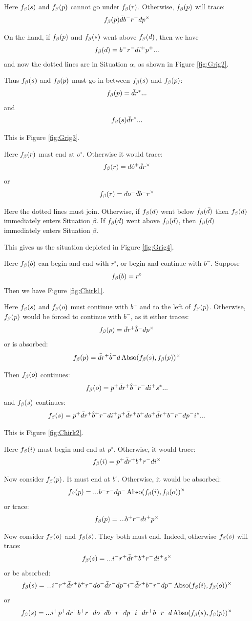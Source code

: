 Here $f_\beta(s)$ and $f_\beta(p)$ cannot go under $f_\beta(r)$. Otherwise, $f_\beta(p)$ will trace:
\[
f_\beta(p)  \bar{d} b^- r^- d p^\times
\]

On the hand, if $f_\beta(p)$ and $f_\beta(s)$ went above $f_\beta(d)$, then we have
\[
f_\beta(d) = b^- r^- d i^+ p^+...
\]
and now the dotted lines are in Situation $\alpha$, as shown in Figure \ref{fig:Grig2}.

Thus $f_\beta(s)$ and $f_\beta(p)$ must go in between $f_\beta(s)$ and $f_\beta(p)$:
\[
f_\beta(p) = \bar{d} r^*...
\]
and
\[
f_\beta(s) \bar{d} r^*...
\]

This is Figure \ref{fig:Grig3}.

Here $f_\beta(r)$ must end at $o^\circ$. Otherwise it would trace:
\[
f_\beta(r) = d \hat{o}^+ \bar{d} r^\times
\]
or
\[
f_\beta(r) = d o^- \bar{d} b^- r^\times
\]

Here the dotted lines must join. Otherwise, if $f_\beta(d)$ went below $f_\beta(\bar{d})$ then $f_\beta(d)$ immediately enters Situation $\beta$. If $f_\beta(d)$ went above $f_\beta(\bar{d})$, then $f_\beta(\bar{d})$ immediately enters Situation $\beta$.

This gives us the situation depicted in Figure \ref{fig:Grig4}.

Here $f_\beta(b)$ can begin and end with $r^\circ$, or begin and continue with $b^-$.
\label{Chirk}
Suppose
\[
f_\beta(b) = r^\circ
\]
Then we have Figure \ref{fig:Chirk1}.

Here $f_\beta(s)$ and $f_\beta(o)$ must continue with $b^+$ and to the left of $f_\beta(p)$. Otherwise, $f_\beta(p)$ would be forced to continue with $b^-$, as it either traces:
\[
f_\beta(p) = \bar{d} r^+ \hat{b}^- d p^\times
\]
or is absorbed:
\[
f_\beta(p) = \bar{d} r^+ \hat{b}^- d \operatorname{Abso}(f_\beta(s), f_\beta(p))^\times
\]

Then $f_\beta(o)$ continues:
\[
f_\beta(o) = p^+ \bar{d} r^+ \hat{b}^+ r^- d i^+ s^*...
\]
and $f_\beta(s)$ continues:
\[
f_\beta(s) = p^+ \bar{d} r^+ \hat{b}^+ r^- d i^+ p^+ \bar{d} r^+ b^+ d o^+ \bar{d} r^+ b^- r^- d p^- i^*...
\]

This is Figure \ref{fig:Chirk2}.

Here $f_\beta(i)$ must begin and end at $p^\circ$. Otherwise, it would trace:
\[
f_\beta(i) = p^+ \bar{d} r^+ b^+ r^- d i^\times
\]

Now consider $f_\beta(p)$. It must end at $b^\circ$. Otherwise, it would be absorbed:
\[
f_\beta(p) = ... b^- r^- d p^- \operatorname{Abso}(f_\beta(i),  f_\beta(o))^\times
\]
or trace:
\[
f_\beta(p) = ... b^+ r^- d i^+ p^\times
\]

Now consider $f_\beta(o)$ and $f_\beta(s)$. They both must end. Indeed, otherwise $f_\beta(s)$ will trace:
\[
f_\beta(s)=...i^- r^+ \bar{d} r^+ b^+ r^- d i^+ s^\times
\]
or be absorbed:
\[
f_\beta(s)=...i^- r^+ \bar{d} r^+ b^+ r^- d o^- \bar{d} r^- d p^- i^- \bar{d} r^+ b^-r^- d p^- \operatorname{Abso}(f_\beta(i), f_\beta(o))^\times
\]
or
\[
f_\beta(s) = ... i^+ p^+\bar{d} r^+ b^+ r^- d o^- \bar{d} b^- r^- d p^- i^- \bar{d} r^+ b^- r^- d \operatorname{Abso}(f_\beta(s), f_\beta(p))^\times
\]

